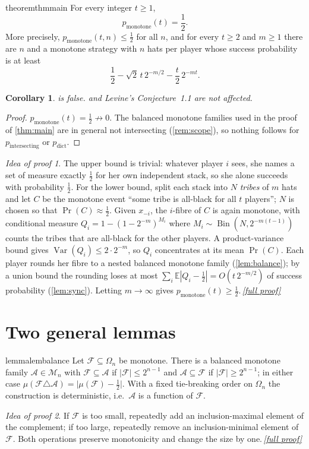 \documentclass[11pt,a4paper]{article}
\theoremstyle{plain}
\newtheorem{corollary}[theorem]{Corollary}
\theoremstyle{definition}
\theoremstyle{remark}
\newtheorem*{proofidea}{Idea of proof}
\newcommand{\fullproofref}[1]{\,\hyperref[#1]{\textit{[full proof]}}}
\newcommand{\E}{\mathbb E}
\newcommand{\Prob}{\Pr}
\DeclareMathOperator{\Var}{Var}
\DeclareMathOperator{\Bin}{Bin}
\newcommand{\cA}{\mathcal A}
\newcommand{\cF}{\mathcal F}
\newcommand{\cM}{\mathcal M}
\newcommand{\pmon}{p_{\mathrm{monotone}}}
\newcommand{\pint}{p_{\mathrm{intersecting}}}
\newcommand{\pdict}{p_{\mathrm{dict}}}
\newcommand{\Om}{\Omega}
\begin{document}
\begin{restatable}{theorem}{thmmain}\label{thm:main}
For every integer $t\ge1$,
\[
 \pmon(t)=\frac12 .
\]
More precisely, $\pmon(t,n)\le\frac12$ for all $n$, and for every $t\ge2$ and $m\ge1$ there are $n$ and a monotone strategy with $n$ hats per player whose success probability is at least
\[
 \frac12-\sqrt2\,t\,2^{-m/2}-\frac t2\,2^{-mt}.
\]
\end{restatable}

\begin{corollary}\label{cor:22}
 is false.  and Levine's Conjecture~1.1 are not affected.
\end{corollary}
\begin{proof}
$\pmon(t)=\frac12\not\to0$. The balanced monotone families used in the proof of \cref{thm:main} are in general not intersecting (\cref{rem:scope}), so nothing follows for $\pint$ or $\pdict$.
\end{proof}

\begin{proofidea}
The upper bound is trivial: whatever player $i$ sees, she names a set of measure exactly $\frac12$ for her own independent stack, so she alone succeeds with probability $\frac12$. For the lower bound, split each stack into $N$ \emph{tribes} of $m$ hats and let $C$ be the monotone event ``some tribe is all-black for all $t$ players''; $N$ is chosen so that $\Prob(C)\approx\frac12$. Given $x_{-i}$, the $i$-fibre of $C$ is again monotone, with conditional measure $Q_i=1-(1-2^{-m})^{M_i}$ where $M_i\sim\Bin(N,2^{-m(t-1)})$ counts the tribes that are all-black for the other players. A product-variance bound gives $\Var(Q_i)\le2\cdot2^{-m}$, so $Q_i$ concentrates at its mean $\Prob(C)$. Each player rounds her fibre to a nested balanced monotone family (\cref{lem:balance}); by a union bound the rounding loses at most $\sum_i\E|Q_i-\frac12|=O(t\,2^{-m/2})$ of success probability (\cref{lem:sync}). Letting $m\to\infty$ gives $\pmon(t)\ge\frac12$.\fullproofref{pf:main}
\end{proofidea}

\section{Two general lemmas}

\begin{restatable}{lemma}{lembalance}\label{lem:balance}
Let $\cF\subseteq\Om_n$ be monotone. There is a balanced monotone family $\cA\in\cM_n$ with $\cF\subseteq\cA$ if $|\cF|\le2^{n-1}$ and $\cA\subseteq\cF$ if $|\cF|\ge2^{n-1}$; in either case $\mu(\cF\triangle\cA)=\bigl|\mu(\cF)-\frac12\bigr|$. With a fixed tie-breaking order on $\Om_n$ the construction is deterministic, i.e.\ $\cA$ is a function of $\cF$.
\end{restatable}
\begin{proofidea}
If $\cF$ is too small, repeatedly add an inclusion-maximal element of the complement; if too large, repeatedly remove an inclusion-minimal element of $\cF$. Both operations preserve monotonicity and change the size by one.\fullproofref{pf:balance}
\end{proofidea}
\end{document}
